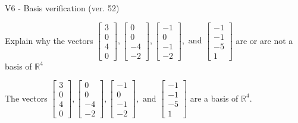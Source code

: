 \begin{exercise}
  \begin{exerciseTitle}V6 - Basis verification (ver. 52)\end{exerciseTitle}
  \begin{exerciseStatement}
    Explain why the vectors \(\left[\begin{array}{r}
3 \\
0 \\
4 \\
0
\end{array}\right] , \left[\begin{array}{r}
0 \\
0 \\
-4 \\
-2
\end{array}\right] , \left[\begin{array}{r}
-1 \\
0 \\
-1 \\
-2
\end{array}\right] , \text{ and } \left[\begin{array}{r}
-1 \\
-1 \\
-5 \\
1
\end{array}\right]\) are or are not a basis of \(\mathbb{R}^4\)	


  \end{exerciseStatement}
  \begin{exerciseAnswer}
   The vectors \(\left[\begin{array}{r}
3 \\
0 \\
4 \\
0
\end{array}\right] , \left[\begin{array}{r}
0 \\
0 \\
-4 \\
-2
\end{array}\right] , \left[\begin{array}{r}
-1 \\
0 \\
-1 \\
-2
\end{array}\right] , \text{ and } \left[\begin{array}{r}
-1 \\
-1 \\
-5 \\
1
\end{array}\right]\) 
  	 are  a basis of \(\mathbb{R}^4\).
  


  \end{exerciseAnswer}
\end{exercise}